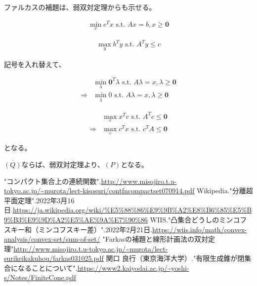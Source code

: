 \documentclass[a4paper, 10pt, dvipdfmx]{jlreq}
\begin{document}
ファルカスの補題は、弱双対定理からも示せる。

\begin{align*}
    \min_{x} c^Tx \text{ s.t. } Ax = b, x \geq \bm{0}
\end{align*}

\begin{align*}
    \max_{y} b^Ty \text{ s.t. } A^Ty \leq c
\end{align*}

記号を入れ替えて、

\begin{align*}
                & \min_{\lambda} \bm{0}^T\lambda \text{ s.t. } A\lambda = x, \lambda \geq \bm{0} \\
    \Rightarrow & \min_{\lambda} 0 \text{ s.t. } A\lambda = x, \lambda \geq \bm{0}
\end{align*}

\begin{align*}
                & \max_{c} x^Tc \text{ s.t. } A^Tc \leq \bm{0} \\
    \Rightarrow & \max_{c} c^Tx \text{ s.t. } c^TA \leq \bm{0}
\end{align*}

となる。

$\overline{(Q)}$ならば、弱双対定理より、$(P)$となる。


\begin{thebibliography}{9}
    "コンパクト集合上の連続関数".\url{http://www.misojiro.t.u-tokyo.ac.jp/~murota/lect-kisosuri/contfncompactset070914.pdf}
    Wikipedia."分離超平面定理".2022年3月16日.\url{https://ja.wikipedia.org/wiki/%E5%88%86%E9%9B%A2%E8%B6%85%E5%B9%B3%E9%9D%A2%E5%AE%9A%E7%90%86}
    WIIS."凸集合どうしのミンコフスキー和（ミンコフスキー差）".2022年2月21日.\url{https://wiis.info/math/convex-analysis/convex-set/sum-of-set/}
    "Farkasの補題と線形計画法の双対定理"\url{http://www.misojiro.t.u-tokyo.ac.jp/~murota/lect-surikeikakuhou/farkas031025.pdf}
    関口 良行（東京海洋大学）."有限生成錐が閉集合になることについて".\url{https://www2.kaiyodai.ac.jp/~yoshi-s/Notes/FiniteCone.pdf}
\end{thebibliography}
\end{document}
